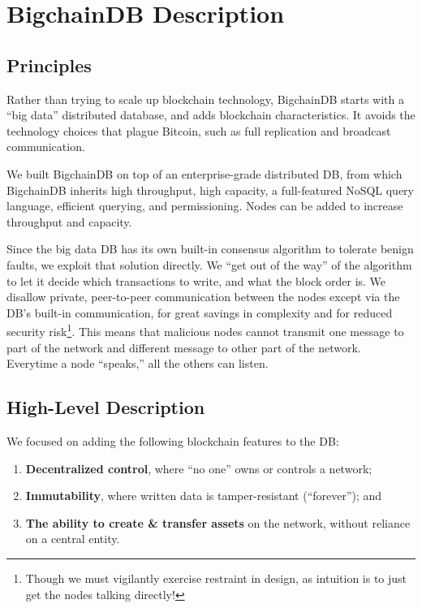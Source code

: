 \section{BigchainDB Description}\label{sec:bigchaindb}

\subsection{Principles}
Rather than trying to scale up blockchain technology, BigchainDB starts with a “big data” distributed database, and adds blockchain characteristics.
It avoids the technology choices that plague Bitcoin, such as full replication and broadcast communication.

We built BigchainDB on top of an enterprise-grade distributed DB, from which BigchainDB inherits high throughput, high capacity, a full-featured NoSQL query language, efficient querying, and permissioning. Nodes can be added to increase throughput and capacity.

Since the big data DB has its own built-in consensus algorithm to tolerate benign faults, we exploit that solution directly.
We “get out of the way” of the algorithm to let it decide which transactions to write, and what the block order is.
We disallow private, peer-to-peer communication between the nodes except via the DB’s built-in communication, for great savings in complexity and for reduced security risk\footnote{Though we must vigilantly exercise restraint in design, as intuition is to just get the nodes talking directly!}.
This means that malicious nodes cannot transmit one message to part of the network and different message to other part of the network. Everytime a node ``speaks,'' all the others can listen.

\subsection{High-Level Description}
We focused on adding the following blockchain features to the DB:
\begin{enumerate}
 \item \textbf{Decentralized control}, where “no one” owns or controls a network;
 \item \textbf{Immutability}, where written data is tamper-resistant (“forever”); and
 \item \textbf{The ability to create \& transfer assets} on the network, without reliance on a central entity.
\end{enumerate}

